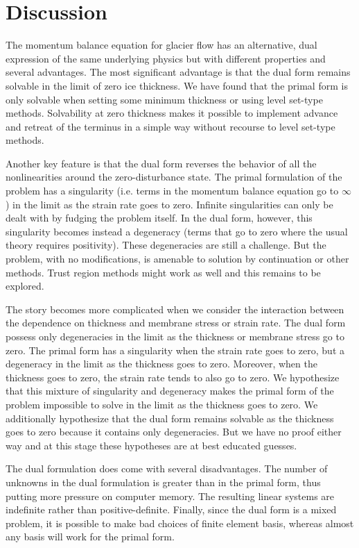 \documentclass[review,oneside]{igs}
\begin{document}
\section{Discussion}

The momentum balance equation for glacier flow has an alternative, dual expression of the same underlying physics but with different properties and several advantages.
The most significant advantage is that the dual form remains solvable in the limit of zero ice thickness.
We have found that the primal form is only solvable when setting some minimum thickness or using level set-type methods.
Solvability at zero thickness makes it possible to implement advance and retreat of the terminus in a simple way without recourse to level set-type methods.

Another key feature is that the dual form reverses the behavior of all the nonlinearities around the zero-disturbance state.
The primal formulation of the problem has a singularity (i.e. terms in the momentum balance equation go to $\infty$) in the limit as the strain rate goes to zero.
Infinite singularities can only be dealt with by fudging the problem itself.
In the dual form, however, this singularity becomes instead a degeneracy (terms that go to zero where the usual theory requires positivity).
These degeneracies are still a challenge.
But the problem, with no modifications, is amenable to solution by continuation or other methods.
Trust region methods might work as well and this remains to be explored.

The story becomes more complicated when we consider the interaction between the dependence on thickness and membrane stress or strain rate.
The dual form possess only degeneracies in the limit as the thickness or membrane stress go to zero.
The primal form has a singularity when the strain rate goes to zero, but a degeneracy in the limit as the thickness goes to zero.
Moreover, when the thickness goes to zero, the strain rate tends to also go to zero.
We hypothesize that this mixture of singularity and degeneracy makes the primal form of the problem impossible to solve in the limit as the thickness goes to zero.
We additionally hypothesize that the dual form remains solvable as the thickness goes to zero because it contains only degeneracies.
But we have no proof either way and at this stage these hypotheses are at best educated guesses.

The dual formulation does come with several disadvantages.
The number of unknowns in the dual formulation is greater than in the primal form, thus putting more pressure on computer memory.
The resulting linear systems are indefinite rather than positive-definite.
Finally, since the dual form is a mixed problem, it is possible to make bad choices of finite element basis, whereas almost any basis will work for the primal form.
\end{document}

